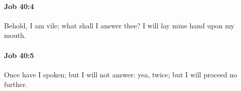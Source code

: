 		\paragraph{Job 40:4} %
			\label{JOB-40-4}

			Behold, I am vile; what shall I answer thee? I will lay mine hand upon my mouth.


		\paragraph{Job 40:5} %
			\label{JOB-40-5}

			Once have I spoken; but I will not answer: yea, twice; but I will proceed no further.


